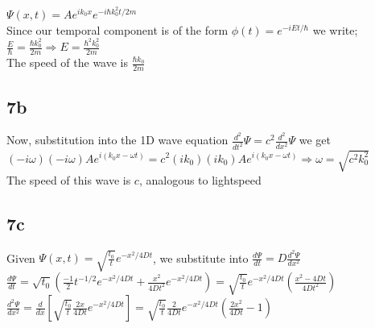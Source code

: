 \documentclass{article}
\begin{document}
$\Psi(x,t)=Ae^{ik_0x}e^{-i\hbar k_0^2t/2m}$\\

Since our temporal component is of the form $\phi(t)=e^{-iEt/\hbar}$ we write;\\

$\frac{E}{\hbar}=\frac{\hbar k_0^2}{2m}\Rightarrow E=\frac{\hbar^2k_0^2}{2m}$\\

The speed of the wave is $\frac{\hbar k_0}{2m}$

\subsection*{7b}

Now, substitution into the 1D wave equation $\frac{d^2}{dt^2}\Psi=c^2\frac{d^2}{dx^2}\Psi$ we get \\

$(-i\omega)(-i\omega)Ae^{i(k_0x-\omega t)}=c^2(ik_0)(ik_0)Ae^{i(k_0x-\omega t)}\Rightarrow\omega=\sqrt{c^2k_0^2}$\\

The speed of this wave is $c$, analogous to lightspeed\\

\subsection*{7c}

Given $\Psi(x,t)=\sqrt{\frac{t_0}{t}}e^{-x^2/4Dt}$, we substitute into $\frac{d\Psi}{dt}=D\frac{d^2\Psi}{dx^2}$\\

$\frac{d\Psi}{dt}=\sqrt{t_0}(\frac{-1}{2}t^{-1/2}e^{-x^2/4Dt}+\frac{x^2}{4Dt^2}e^{-x^2/4Dt})=\sqrt{\frac{t_0}{t}}e^{-x^2/4Dt}(\frac{x^2-4Dt}{4Dt^2})$\\

$\frac{d^2\Psi}{dx^2}=\frac{d}{dx}[\sqrt{\frac{t_0}{t}}\frac{2x}{4Dt}e^{-x^2/4Dt}]=\sqrt{\frac{t_0}{t}}\frac{2}{4Dt}e^{-x^2/4Dt}(\frac{2x^2}{4Dt}-1)$\\
\end{document}
